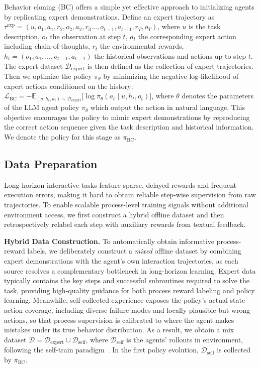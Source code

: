 \documentclass{article}
\theoremstyle{plain}
\theoremstyle{definition}
\theoremstyle{remark}
\begin{document}
\label{sec:warmup}
Behavior cloning (BC) offers a simple yet effective approach to initializing agents by replicating expert demonstrations. 
Define an expert trajectory as 
$\tau^{\text{exp}} = (u, o_1, a_1, r_2, o_2, a_2, r_3 \dots, o_{t-1}, a_{t-1}, r_T, o_T)$, 
where $u$ is the task description, $o_t$ the observation at step $t$, $a_t$ the corresponding expert action including chain-of-thoughts, $r_t$ the environmental rewards, $h_t=(o_1, a_1, \dots, o_{t-1}, a_{t-1})$ the historical observations and actions up to step $t$. 
The expert dataset $\mathcal{D}_{\text{expert}}$ is then defined as the collection of expert trajectories.  
Then we optimize the policy $\pi_{\theta}$ by minimizing the negative log-likelihood of expert actions conditioned on the history:
$\mathcal{L}_{\text{BC}}
    = - \mathbb{E}_{(u,h_t,a_t) \sim \mathcal{D}_{\text{expert}}} 
    \big[ \log \pi_{\theta}(a_t \mid u, h_t, o_t) \big]$,
where $\theta$ denotes the parameters of the LLM agent policy $\pi_{\theta}$ which output the action in natural language.
This objective encourages the policy to mimic expert demonstrations by reproducing the correct action sequence given the task description and historical information. 
 We denote the policy for this stage as $\pi_{\text{BC}}$.


\subsection{Data Preparation}

Long-horizon interactive tasks feature sparse, delayed rewards and frequent execution errors, making it hard to obtain reliable step-wise supervision from raw trajectories. To enable scalable process-level training signals without additional environment access, we first construct a hybrid offline dataset and then retrospectively relabel each step with auxiliary rewards from textual feedback.

\label{sec:hrr}
\textbf{Hybrid Data Construction.} To automatically obtain informative process-reward labels, we deliberately construct a \emph{mixed} offline dataset by combining expert demonstrations with the agent’s own interaction trajectories, as each source resolves a complementary bottleneck in long-horizon learning. Expert data typically contains the key steps and successful subroutines required to solve the task, providing high-quality guidance for both process reward labeling and policy learning. Meanwhile, self-collected experience exposes the policy’s actual state-action coverage, including diverse failure modes and locally plausible but wrong actions, so that process supervision is calibrated to where the agent makes mistakes under its true behavior distribution.
As a result, we obtain a mix dataset $\mathcal{D} = \mathcal{D}_{\text{expert}}\cup\mathcal{D}_{\text{self}}$, where $\mathcal{D}_{\text{self}}$ is the agents' rollouts in environment, following the self-train paradigm~\citep{dou2024re}. In the first policy evolution, $\mathcal{D}_{\text{self}}$ is collected by $\pi_{\text{BC}}$.
\end{document}

